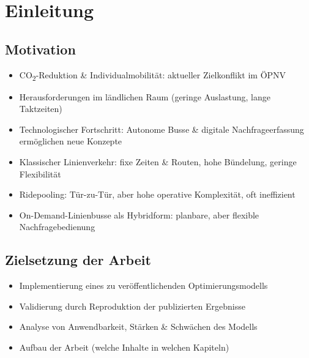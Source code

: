 \chapter{Einleitung}
\section{Motivation}

\begin{itemize}
    \item CO\textsubscript{2}-Reduktion \& Individualmobilität: aktueller Zielkonflikt im ÖPNV
    \item Herausforderungen im ländlichen Raum (geringe Auslastung, lange Taktzeiten)
    \item Technologischer Fortschritt: Autonome Busse \& digitale Nachfrageerfassung ermöglichen neue Konzepte
    \item Klassischer Linienverkehr: fixe Zeiten \& Routen, hohe Bündelung, geringe Flexibilität
    \item Ridepooling: Tür-zu-Tür, aber hohe operative Komplexität, oft ineffizient
    \item On-Demand-Linienbusse als Hybridform: planbare, aber flexible Nachfragebedienung
\end{itemize}
\section{Zielsetzung der Arbeit}
\begin{itemize}
    \item Implementierung eines zu veröffentlichenden Optimierungsmodells
    \item Validierung durch Reproduktion der publizierten Ergebnisse
    \item Analyse von Anwendbarkeit, Stärken \& Schwächen des Modells
    \item Aufbau der Arbeit (welche Inhalte in welchen Kapiteln)
\end{itemize}
